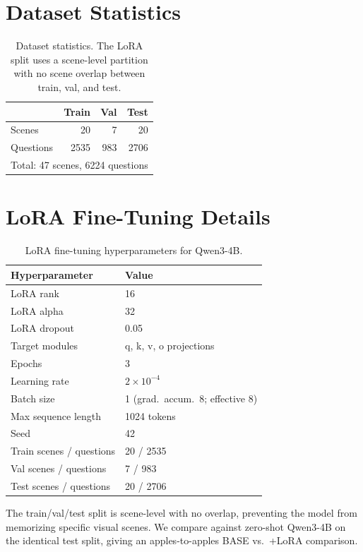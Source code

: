 \clearpage
\setcounter{page}{1}
\maketitlesupplementary

\section{Dataset Statistics}
\label{sec:suppl-dataset}

\begin{table}[h]
  \centering
  \caption{Dataset statistics. The LoRA split uses a scene-level partition with no
  scene overlap between train, val, and test.}
  \label{tab:dataset_stats}
  \begin{tabular}{lrrr}
    \toprule
    & \textbf{Train} & \textbf{Val} & \textbf{Test} \\
    \midrule
    Scenes      & 20    & 7   & 20   \\
    Questions   & 2535  & 983 & 2706 \\
    \midrule
    \multicolumn{4}{l}{\small Total: 47 scenes, 6224 questions} \\
    \bottomrule
  \end{tabular}
\end{table}

\section{LoRA Fine-Tuning Details}
\label{sec:suppl-lora}

\begin{table}[h]
  \centering
  \caption{LoRA fine-tuning hyperparameters for Qwen3-4B.}
  \label{tab:lora_hparams}
  \begin{tabular}{ll}
    \toprule
    \textbf{Hyperparameter} & \textbf{Value} \\
    \midrule
    LoRA rank               & 16 \\
    LoRA alpha              & 32 \\
    LoRA dropout            & 0.05 \\
    Target modules          & q, k, v, o projections \\
    Epochs                  & 3 \\
    Learning rate           & $2\times10^{-4}$ \\
    Batch size              & 1 (grad.\ accum.\ 8; effective 8) \\
    Max sequence length     & 1024 tokens \\
    Seed                    & 42 \\
    \midrule
    Train scenes / questions  & 20 / 2535 \\
    Val scenes / questions    & 7 / 983 \\
    Test scenes / questions   & 20 / 2706 \\
    \bottomrule
  \end{tabular}
\end{table}

The train/val/test split is scene-level with no overlap, preventing the model from
memorizing specific visual scenes. We compare against zero-shot Qwen3-4B on the identical
test split, giving an apples-to-apples BASE vs.\ +LoRA comparison.
